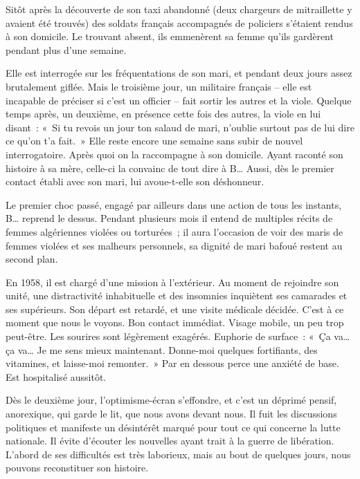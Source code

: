 \documentclass[french,twoside]{book} %
\begin{document}
Sitôt après la découverte de son taxi abandonné (deux chargeurs de mitraillette y avaient été trouvés) des soldats français accompagnés de policiers s’étaient rendus à son domicile. Le trouvant absent, ils emmenèrent sa femme qu’ils gardèrent pendant plus d’une semaine.\par
Elle est interrogée sur les fréquentations de son mari, et pendant deux jours assez brutalement giflée. Mais le troisième jour, un militaire français – elle est incapable de préciser si c’est un officier – fait sortir les autres et la viole. Quelque temps après, un deuxième, en présence cette fois des autres, la viole en lui disant : « Si tu revois un jour ton salaud de mari, n’oublie surtout pas de lui dire ce qu’on t’a fait. » Elle reste encore une semaine sans subir de nouvel interrogatoire. Après quoi on la raccompagne à son domicile. Ayant raconté son histoire à sa mère, celle-ci la convainc de tout dire à B… Aussi, dès le premier contact établi avec son mari, lui avoue-t-elle son déshonneur.\par
Le premier choc passé, engagé par ailleurs dans une action de tous les instants, B… reprend le dessus. Pendant plusieurs mois il entend de multiples récits de femmes algériennes violées ou torturées ; il aura l’occasion de voir des maris de femmes violées et ses malheurs personnels, sa dignité de mari bafoué restent au second plan.\par
En 1958, il est chargé d’une mission à l’extérieur. Au moment de rejoindre son unité, une distractivité inhabituelle et des insomnies inquiètent ses camarades et ses supérieurs. Son départ est retardé, et une visite médicale décidée. C’est à ce   moment que nous le voyons. Bon contact immédiat. Visage mobile, un peu trop peut-être. Les sourires sont légèrement exagérés. Euphorie de surface : « Ça va… ça va… Je me sens mieux maintenant. Donne-moi quelques fortifiants, des vitamines, et laisse-moi remonter. » Par en dessous perce une anxiété de base. Est hospitalisé aussitôt.\par
Dès le deuxième jour, l’optimisme-écran s’effondre, et c’est un déprimé pensif, anorexique, qui garde le lit, que nous avons devant nous. Il fuit les discussions politiques et manifeste un désintérêt marqué pour tout ce qui concerne la lutte nationale. Il évite d’écouter les nouvelles ayant trait à la guerre de libération. L’abord de ses difficultés est très laborieux, mais au bout de quelques jours, nous pouvons reconstituer son histoire.\par
\end{document}
